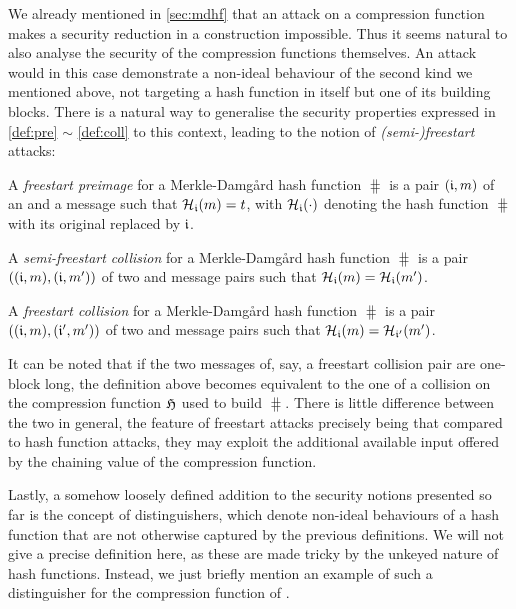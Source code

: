\bigskip

We already mentioned in \autoref{sec:mdhf} that an attack on a compression function makes a security reduction in a \merkdam construction impossible.
Thus it seems natural to also
analyse the security of the compression functions themselves. An attack would in this case demonstrate a non-ideal behaviour of the second kind we mentioned above, not targeting
a hash function in itself but one of its building blocks. There is a natural way to generalise the security properties expressed in \autoref{def:pre} $\sim$ \autoref{def:coll} to this context,
leading to the notion of \emph{(semi-)freestart} attacks:

\begin{defi}
A \emph{freestart preimage} for a Merkle-Damg\aa rd hash function $\hash$ is a pair $(\mathfrak{i},m)$
of an \iv and a message such that $\operatorname{\mathcal{H}}_{\mathfrak{i}}(m) = t$, with $\operatorname{\mathcal{H}}_{\mathfrak{i}}(\cdot)$ denoting
the hash function $\hash$ with its original \iv replaced by $\mathfrak{i}$.
\label{def:free_pre}
\end{defi}

\begin{defi}
A \emph{semi-freestart collision} for a Merkle-Damg\aa rd hash function $\hash$ is a pair $((\mathfrak{i},m), (\mathfrak{i},m'))$
of two \iv and message pairs such that $\operatorname{\mathcal{H}}_{\mathfrak{i}}(m) = \operatorname{\mathcal{H}}_{\mathfrak{i}}(m')$.
\label{def:semi-free_coll}
\end{defi}

\begin{defi}
A \emph{freestart collision} for a Merkle-Damg\aa rd hash function $\hash$ is a pair $((\mathfrak{i},m), (\mathfrak{i}',m'))$
of two \iv and message pairs such that $\operatorname{\mathcal{H}}_{\mathfrak{i}}(m) = \operatorname{\mathcal{H}}_{\mathfrak{i}'}(m')$.
\label{def:free_coll}
\end{defi}

It can be noted that if the two messages of, say, a freestart collision pair are one-block long, the definition above becomes equivalent to the one of a collision
on the compression function $\operatorname{\mathfrak{H}}$ used to build $\hash$.
There is little difference between the two in general, the feature of freestart attacks precisely being that compared to hash function attacks, they may exploit the additional available input offered by the chaining value
of the compression function.


\bigskip

Lastly, a somehow loosely defined addition to the security notions presented so far is the concept of distinguishers, which denote non-ideal behaviours
of a hash function that are not otherwise captured by the previous definitions. We will not give a precise definition here, as these are made tricky by
the unkeyed nature of hash functions. Instead, we just briefly mention an example of such a distinguisher for the compression function of \shaone.


